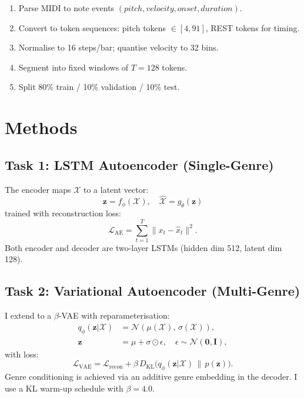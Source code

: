 \documentclass{article}
\begin{document}
\begin{enumerate}
  \item Parse MIDI to note events $(pitch, velocity, onset, duration)$.
  \item Convert to token sequences: pitch tokens $\in [4, 91]$, REST tokens for timing.
  \item Normalise to 16 steps/bar; quantise velocity to 32 bins.
  \item Segment into fixed windows of $T = 128$ tokens.
  \item Split 80\% train / 10\% validation / 10\% test.
\end{enumerate}

\section{Methods}

\subsection{Task 1: LSTM Autoencoder (Single-Genre)}

The encoder maps $\mathcal{X}$ to a latent vector:
\begin{equation}
  \mathbf{z} = f_\phi(\mathcal{X}), \quad
  \hat{\mathcal{X}} = g_\theta(\mathbf{z})
\end{equation}
trained with reconstruction loss:
\begin{equation}
  \mathcal{L}_{\text{AE}} = \sum_{t=1}^{T} \|x_t - \hat{x}_t\|^2.
\end{equation}
Both encoder and decoder are two-layer LSTMs (hidden dim 512, latent dim 128).

\subsection{Task 2: Variational Autoencoder (Multi-Genre)}

I extend to a $\beta$-VAE \cite{higgins2017beta} with reparameterisation:
\begin{align}
  q_\phi(\mathbf{z}|\mathcal{X}) &= \mathcal{N}(\mu(\mathcal{X}),\,\sigma(\mathcal{X})), \\
  \mathbf{z} &= \mu + \sigma \odot \epsilon, \quad \epsilon \sim \mathcal{N}(\mathbf{0}, \mathbf{I}),
\end{align}
with loss:
\begin{equation}
  \mathcal{L}_{\text{VAE}} = \mathcal{L}_{\text{recon}}
    + \beta\, D_{\mathrm{KL}}\!\bigl(q_\phi(\mathbf{z}|\mathcal{X})\,\|\,p(\mathbf{z})\bigr).
\end{equation}
Genre conditioning is achieved via an additive genre embedding in the decoder.
I use a KL warm-up schedule with $\beta=4.0$.
\end{document}
